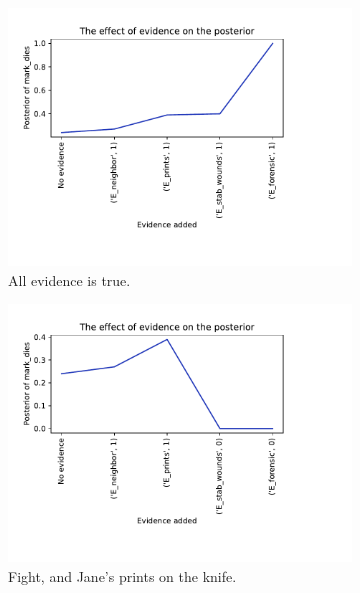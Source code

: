 \begin{enumerate}
\begin{figure}[htbp]
\begin{center}
\begin{subfigure}{.66\textwidth}
\includegraphics[width=\linewidth]{../experiments/WalkThrough/plots/evidence_progress_WalkThrough_1.pdf}
\caption{All evidence is true.}
\label{default}
\end{subfigure}%
\begin{subfigure}{.66\textwidth}
\includegraphics[width=\linewidth]{../experiments/WalkThrough/plots/evidence_progress_WalkThrough_2.pdf}
\caption{Fight, and Jane's prints on the knife.}
\label{default}
\end{subfigure}
\begin{subfigure}{.66\textwidth}

\end{subfigure}
\end{center}
\end{figure}
\end{enumerate}
